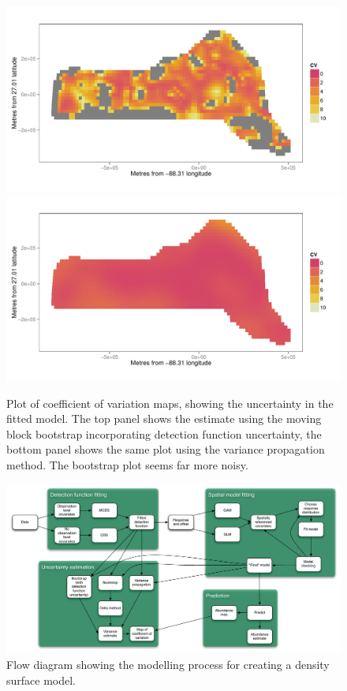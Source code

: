 \documentclass[a4paper,12pt]{article}
\begin{document}
\begin{figure}[h!]
  \caption{Plot of coefficient of variation maps, showing the uncertainty in the fitted model. The top panel shows the estimate using the moving block bootstrap incorporating detection function uncertainty, the bottom panel shows the same plot using the variance propagation method. The bootstrap plot seems far more noisy.}
  \label{cv-plot}
  \begin{center}
    \includegraphics[width=\textwidth]{figs/cvplot-movblk}\\ \includegraphics[width=\textwidth]{figs/cvplot-varprop}
  \end{center}
\end{figure}

\newpage

\begin{figure}[h!]
  \caption{Flow diagram showing the modelling process for creating a density surface model.}
  \label{flow}
  \begin{center}
    \includegraphics[width=\textwidth]{figs/flowdiagram-reduced}
  \end{center}
\end{figure}
\end{document}
